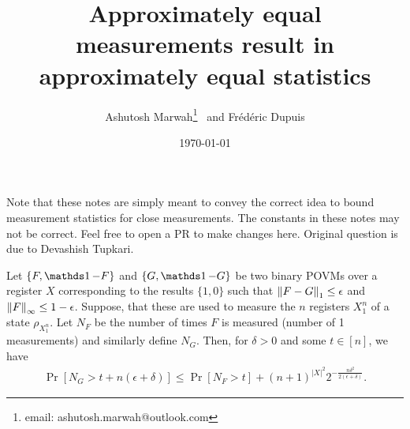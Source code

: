 \documentclass[11pt, oneside]{article}   	%
\title{Approximately equal measurements result in approximately equal statistics}
\author{Ashutosh Marwah\footnote{email: ashutosh.marwah@outlook.com} \ and Fr\'ed\'eric Dupuis}
\affil{\small{D\'epartement d'informatique et de recherche op\'erationnelle,\\ Universit\'e de Montr\'eal,\\ Montr\'eal QC, Canada}}
\date{\today}							%
\begin{document}
\maketitle

Note that these notes are simply meant to convey the correct idea to bound measurement statistics for close measurements. The constants in these notes may not be correct. Feel free to open a PR to make changes here. Original question is due to Devashish Tupkari. 

\begin{lemma}
    Let $\{F, \Id - F\}$ and $\{G, \Id - G\}$ be two binary POVMs over a register $X$ corresponding to the results $\{1, 0\}$ such that $\left\Vert F - G \right\Vert_1 \leq \epsilon$ and $\left\Vert F \right\Vert_\infty \leq 1- \epsilon$. Suppose, that these are used to measure the $n$ registers $X_1^n$ of a state $\rho_{X_1^n}$. Let $N_F$ be the number of times $F$ is measured (number of 1 measurements) and similarly define $N_G$. Then, for $\delta > 0$ and some $t \in [n]$, we have 
    \begin{align}
        \Pr [N_G > t + n(\epsilon + \delta)] \leq \Pr [N_F > t] + (n+1)^{|X|^2}2^{- \frac{n \delta^2}{2(\epsilon + \delta)}}.
    \end{align}
\end{lemma}
\end{document}
